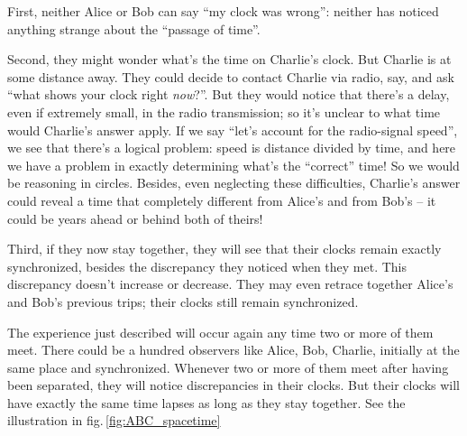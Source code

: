 \documentclass[a4paper,12pt,%
onecolumn,oneside,titlepage,%
british%
]{memoir}
\renewcommand*{\|}[1][]{\nonscript\:#1\vert\nonscript\:\mathopen{}}
\newcommand*{\fig}{fig.}%
\begin{document}
First, neither Alice or Bob can say \enquote{my clock was wrong}: neither has noticed anything strange about the \enquote{passage of time}.

Second, they might wonder what's the time on Charlie's clock. But Charlie is at some distance away. They could decide to contact Charlie via radio, say, and ask \enquote{what shows your clock right \emph{now}?}. But they would notice that there's a delay, even if extremely small, in the radio transmission; so it's unclear to what time would Charlie's answer apply. If we say \enquote{let's account for the radio-signal speed}, we see that there's a logical problem: speed is distance divided by time, and here we have a problem in exactly determining what's the \enquote{correct} time! So we would be reasoning in circles. Besides, even neglecting these difficulties, Charlie's answer could reveal a time that completely different from Alice's and from Bob's -- it could be years ahead or behind both of theirs!

Third, if they now stay together, they will see that their clocks remain exactly synchronized, besides the discrepancy they noticed when they met. This discrepancy doesn't increase or decrease. They may even retrace together Alice's and Bob's previous trips; their clocks still remain synchronized.

The experience just described will occur again any time two or more of them meet. There could be a hundred observers like Alice, Bob, Charlie, initially at the same place and synchronized. Whenever two or more of them meet after having been separated, they will notice discrepancies in their clocks. But their clocks will have exactly the same time lapses as long as they stay together. See the illustration in \fig\,\ref{fig:ABC_spacetime}
\end{document}
